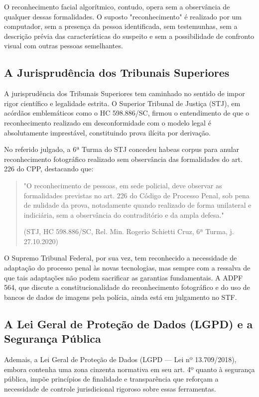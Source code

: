 \documentclass[12pt,a4paper]{article}
\begin{document}
O reconhecimento facial algorítmico, contudo, opera sem a observância de qualquer dessas formalidades. O suposto "reconhecimento" é realizado por um computador, sem a presença da pessoa identificada, sem testemunhas, sem a descrição prévia das características do suspeito e sem a possibilidade de confronto visual com outras pessoas semelhantes.

\subsection{A Jurisprudência dos Tribunais Superiores}

A jurisprudência dos Tribunais Superiores tem caminhado no sentido de impor rigor científico e legalidade estrita. O Superior Tribunal de Justiça (STJ), em acórdãos emblemáticos como o HC 598.886/SC, firmou o entendimento de que o reconhecimento realizado em desconformidade com o modelo legal é absolutamente imprestável, constituindo prova ilícita por derivação.

No referido julgado, a 6ª Turma do STJ concedeu habeas corpus para anular reconhecimento fotográfico realizado sem observância das formalidades do art. 226 do CPP, destacando que:

\begin{quote}
"O reconhecimento de pessoas, em sede policial, deve observar as formalidades previstas no art. 226 do Código de Processo Penal, sob pena de nulidade da prova, notadamente quando realizado de forma unilateral e indiciária, sem a observância do contraditório e da ampla defesa."

(STJ, HC 598.886/SC, Rel. Min. Rogerio Schietti Cruz, 6ª Turma, j. 27.10.2020)
\end{quote}

O Supremo Tribunal Federal, por sua vez, tem reconhecido a necessidade de adaptação do processo penal às novas tecnologias, mas sempre com a ressalva de que tais adaptações não podem sacrificar as garantias fundamentais. A ADPF 564, que discute a constitucionalidade do reconhecimento fotográfico e do uso de bancos de dados de imagens pela polícia, ainda está em julgamento no STF.

\subsection{A Lei Geral de Proteção de Dados (LGPD) e a Segurança Pública}

Ademais, a Lei Geral de Proteção de Dados (LGPD --- Lei nº 13.709/2018), embora contenha uma zona cinzenta normativa em seu art. 4º quanto à segurança pública, impõe princípios de finalidade e transparência que reforçam a necessidade de controle jurisdicional rigoroso sobre essas ferramentas.
\end{document}
